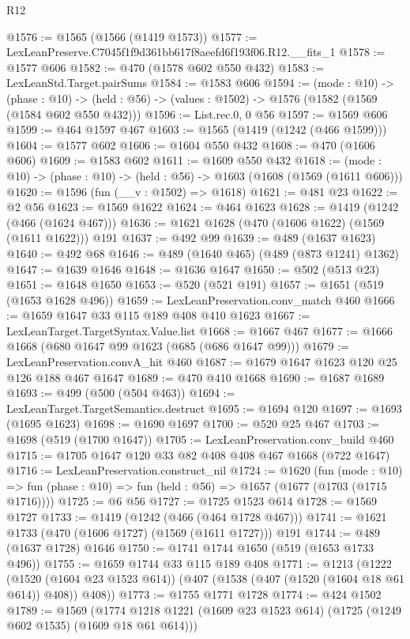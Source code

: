 \begin{lexlean}{R12}
\begin{coremodule}
@1576 := @1565 (@1566 (@1419 @1573))
@1577 := LexLeanPreserve.C7045f1f9d361bb617f8aeefd6f193f06.R12.__fits_1
@1578 := @1577 @606
@1582 := @470 (@1578 @602 @550 @432)
@1583 := LexLeanStd.Target.pairSums
@1584 := @1583 @606
@1594 := (mode : @10) ->
  (phase : @10) -> (held : @56) -> (values : @1502) -> @1576 (@1582 (@1569 (@1584 @602 @550 @432)))
@1596 := List.rec.{0, 0} @56
@1597 := @1569 @606
@1599 := @464 @1597 @467
@1603 := @1565 (@1419 (@1242 (@466 @1599)))
@1604 := @1577 @602
@1606 := @1604 @550 @432
@1608 := @470 (@1606 @606)
@1609 := @1583 @602
@1611 := @1609 @550 @432
@1618 := (mode : @10) -> (phase : @10) -> (held : @56) -> @1603 (@1608 (@1569 (@1611 @606)))
@1620 := @1596 (fun (__v : @1502) => @1618)
@1621 := @481 @23
@1622 := @2 @56
@1623 := @1569 @1622
@1624 := @464 @1623
@1628 := @1419 (@1242 (@466 (@1624 @467)))
@1636 := @1621 @1628 (@470 (@1606 @1622) (@1569 (@1611 @1622))) @191
@1637 := @492 @99
@1639 := @489 (@1637 @1623)
@1640 := @492 @68
@1646 := @489 (@1640 @465) (@489 (@873 @1241) @1362)
@1647 := @1639 @1646
@1648 := @1636 @1647
@1650 := @502 (@513 @23)
@1651 := @1648 @1650
@1653 := @520 (@521 @191)
@1657 := @1651 (@519 (@1653 @1628 @496))
@1659 := LexLeanPreservation.conv_match @460
@1666 := @1659 @1647 @33 @115 @189 @408 @410 @1623
@1667 := LexLeanTarget.TargetSyntax.Value.list
@1668 := @1667 @467
@1677 := @1666 @1668 (@680 @1647 @99 @1623 (@685 (@686 @1647 @99)))
@1679 := LexLeanPreservation.convA_hit @460
@1687 := @1679 @1647 @1623 @120 @25 @126 @188 @467 @1647
@1689 := @470 @410 @1668
@1690 := @1687 @1689
@1693 := @499 (@500 (@504 @463))
@1694 := LexLeanTarget.TargetSemantics.destruct
@1695 := @1694 @120
@1697 := @1693 (@1695 @1623)
@1698 := @1690 @1697
@1700 := @520 @25 @467
@1703 := @1698 (@519 (@1700 @1647))
@1705 := LexLeanPreservation.conv_build @460
@1715 := @1705 @1647 @120 @33 @82 @408 @408 @467 @1668 (@722 @1647)
@1716 := LexLeanPreservation.construct_nil
@1724 := @1620
    (fun (mode : @10) =>
    fun (phase : @10) => fun (held : @56) => @1657 (@1677 (@1703 (@1715 @1716))))
@1725 := @6 @56
@1727 := @1725 @1523 @614
@1728 := @1569 @1727
@1733 := @1419 (@1242 (@466 (@464 @1728 @467)))
@1741 := @1621 @1733 (@470 (@1606 @1727) (@1569 (@1611 @1727))) @191
@1744 := @489 (@1637 @1728) @1646
@1750 := @1741 @1744 @1650 (@519 (@1653 @1733 @496))
@1755 := @1659 @1744 @33 @115 @189 @408
@1771 := @1213
    (@1222
      (@1520 (@1604 @23 @1523 @614))
      (@407 (@1538 (@407 (@1520 (@1604 @18 @61 @614)) @408)) @408))
@1773 := @1755 @1771 @1728
@1774 := @424 @1502
@1789 := @1569
    (@1774 @1218 @1221 (@1609 @23 @1523 @614) (@1725 (@1249 @602 @1535) (@1609 @18 @61 @614)))

\end{coremodule}
\end{lexlean}
